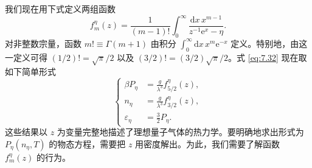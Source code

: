 我们现在用下式定义两组函数
\begin{equation}\label{eq:7.33}
f_m^\eta(z)=\frac1{(m-1)!}\int_0^\infty\frac{\mathrm dx\,x^{m-1}}{z^{-1}\mathrm e^x-\eta}.
\end{equation}
对非整数宗量，函数 $m!\equiv\Gamma(m+1)$ 由积分 $\int_0^\infty\mathrm dx\,x^m\mathrm e^{-x}$ 定义。特别地，由这一定义可得 $(1/2)!=\sqrt\pi/2$ 以及 $(3/2)!=(3/2)\sqrt\pi/2$。式 \eqref{eq:7.32} 现在取如下简单形式
\begin{equation}\label{eq:7.34}
\left\{\begin{aligned}
\beta P_\eta&=\frac g{\lambda^3}f_{5/2}^\eta(z),\\[1ex]
n_\eta&=\frac g{\lambda^3}f_{3/2}^\eta(z),\\[1ex]
\varepsilon_\eta&=\frac32P_\eta.
\end{aligned}\right.
\end{equation}
这些结果以 $z$ 为变量完整地描述了理想量子气体的热力学。要明确地求出形式为 $P_\eta(n_\eta,T)$ 的物态方程，需要把 $z$ 用密度解出。为此，我们需要了解函数 $f_m^\eta(z)$ 的行为。

